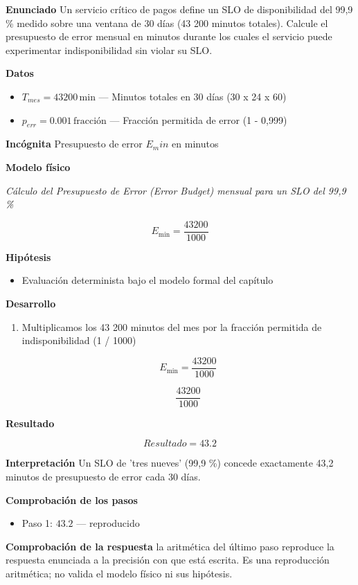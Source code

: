 \documentclass{book}
\begin{document}
\begin{tcolorbox}[title={Problema resuelto}, studiumworked, breakable]

\noindent\textbf{Enunciado}
Un servicio crítico de pagos define un SLO de disponibilidad del 99,9 \% medido sobre una ventana de 30 días (43 200 minutos totales). Calcule el presupuesto de error mensual en minutos durante los cuales el servicio puede experimentar indisponibilidad sin violar su SLO.

\noindent\textbf{Datos}
\begin{itemize}
\item $T_{mes} = 43200\,\mathrm{min}$ — Minutos totales en 30 días (30 x 24 x 60)
\item $p_{err} = 0.001\,\mathrm{fracción}$ — Fracción permitida de error (1 - 0,999)
\end{itemize}

\noindent\textbf{Incógnita}
Presupuesto de error \(E_min\) en minutos

\noindent\textbf{Modelo físico}

\noindent\textit{Cálculo del Presupuesto de Error (Error Budget) mensual para un SLO del 99,9 \%}

\[
E_{\text{min}} = \frac{43200}{1000}
\]

\noindent\textbf{Hipótesis}
\begin{itemize}
\item Evaluación determinista bajo el modelo formal del capítulo
\end{itemize}

\noindent\textbf{Desarrollo}
\begin{enumerate}
\item
Multiplicamos los 43 200 minutos del mes por la fracción permitida de indisponibilidad (1 / 1000)

\[
E_{\text{min}} = \frac{43200}{1000}
\]

\[
\frac{43200}{1000}
\]
\end{enumerate}

\noindent\textbf{Resultado}

\[
Resultado = 43.2
\]

\noindent\textbf{Interpretación}
Un SLO de 'tres nueves' (99,9 \%) concede exactamente 43,2 minutos de presupuesto de error cada 30 días.

\noindent\textbf{Comprobación de los pasos}
\begin{itemize}
\item Paso 1: $43.2$ — reproducido
\end{itemize}

\noindent\textbf{Comprobación de la respuesta} la aritmética del último paso reproduce la respuesta enunciada a la precisión con que está escrita. Es una reproducción aritmética; no valida el modelo físico ni sus hipótesis.
\end{tcolorbox}
\end{document}
